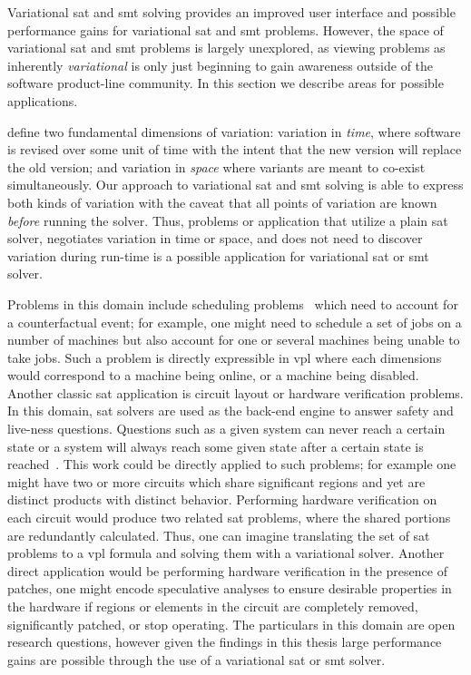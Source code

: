\label{section:conclusion:applications}
%
Variational \ac{sat} and \ac{smt} solving provides an improved user interface
and possible performance gains for variational \ac{sat} and \ac{smt} problems.
However, the space of variational \ac{sat} and \ac{smt} problems is largely
unexplored, as viewing problems as inherently \emph{variational} is only just
beginning to gain awareness outside of the software product-line community. In
this section we describe areas for possible applications.

\citet{TTS+:VariVolution19} define two fundamental dimensions of variation:
variation in \emph{time}, where software is revised over some unit of time with
the intent that the new version will replace the old version; and variation in
\emph{space} where variants are meant to co-exist simultaneously. Our approach
to variational \ac{sat} and \ac{smt} solving is able to express both kinds of
variation with the caveat that all points of variation are known \emph{before}
running the solver. Thus, problems or application that utilize a plain \ac{sat}
solver, negotiates variation in time or space, and does not need to discover
variation during run-time is a possible application for variational \ac{sat} or
\ac{smt} solver.

Problems in this domain include scheduling problems~\cite{BBH+09} which need to
account for a counterfactual event; for example, one might need to schedule a
set of jobs on a number of machines but also account for one or several machines
being unable to take jobs. Such a problem is directly expressible in \ac{vpl}
where each dimensions would correspond to a machine being online, or a machine
being disabled. Another classic \ac{sat} application is circuit
layout or hardware verification problems. In this domain, \ac{sat} solvers are
used as the back-end engine to answer safety and live-ness questions. Questions
such as a given system can never reach a certain state or a system will always
reach some given state after a certain state is reached~\cite{BBH+09}. This work
could be directly applied to such problems; for example one might have two or
more circuits which share significant regions and yet are distinct products with
distinct behavior. Performing hardware verification on each circuit would
produce two related \ac{sat} problems, where the shared portions are redundantly
calculated. Thus, one can imagine translating the set of \ac{sat} problems to a
\ac{vpl} formula and solving them with a variational solver. Another direct
application would be performing hardware verification in the presence of
patches, one might encode speculative analyses to ensure desirable properties in
the hardware if regions or elements in the circuit are completely removed,
significantly patched, or stop operating. The particulars in this domain are
open research questions, however given the findings in this thesis large
performance gains are possible through the use of a variational \ac{sat} or
\ac{smt} solver.


